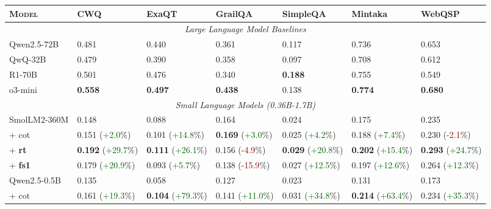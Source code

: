 \documentclass[11pt]{article}
\begin{document}
\begin{table}[t]
\centering
{}
\scriptsize
\begin{tabular}{lllllll}
\toprule
\textsc{Model} & \textbf{CWQ} & \textbf{ExaQT} & \textbf{GrailQA} & \textbf{SimpleQA} & \textbf{Mintaka} & \textbf{WebQSP} \\
\midrule
\multicolumn{7}{c}{\emph{Large Language Model Baselines}} \\
\midrule
Qwen2.5-72B & 0.481 & 0.440 & 0.361 & 0.117 & 0.736 & 0.653 \\
QwQ-32B & 0.479 & 0.390 & 0.358 & 0.097 & 0.708 & 0.612 \\
R1-70B & 0.501 & 0.476 & 0.340 & \textbf{0.188} & 0.755 & 0.549 \\
o3-mini & \textbf{0.558} & \textbf{0.497} & \textbf{0.438} & 0.138 & \textbf{0.774} & \textbf{0.680} \\
\midrule
\multicolumn{7}{c}{\emph{Small Language Models (0.36B-1.7B)}} \\
\midrule
SmolLM2-360M & 0.148 & 0.088 & 0.164 & 0.024 & 0.175 & 0.235 \\
\hspace{1em} + {cot} & 0.151 (\textcolor{darkgreen}{+2.0}\%) & 0.101 (\textcolor{darkgreen}{+14.8}\%) & \textbf{0.169} (\textcolor{darkgreen}{+3.0}\%) & 0.025 (\textcolor{darkgreen}{+4.2}\%) & 0.188 (\textcolor{darkgreen}{+7.4}\%) & 0.230 (\textcolor{darkred}{-2.1}\%) \\
\hspace{1em} + {\textbf{rt}} & \textbf{0.192} (\textcolor{darkgreen}{+29.7}\%) & \textbf{0.111} (\textcolor{darkgreen}{+26.1}\%) & 0.156 (\textcolor{darkred}{-4.9}\%) & \textbf{0.029} (\textcolor{darkgreen}{+20.8}\%) & \textbf{0.202} (\textcolor{darkgreen}{+15.4}\%) & \textbf{0.293} (\textcolor{darkgreen}{+24.7}\%) \\
\hspace{1em} + {\textbf{fs1}} & 0.179 (\textcolor{darkgreen}{+20.9}\%) & 0.093 (\textcolor{darkgreen}{+5.7}\%) & 0.138 (\textcolor{darkred}{-15.9}\%) & 0.027 (\textcolor{darkgreen}{+12.5}\%) & 0.197 (\textcolor{darkgreen}{+12.6}\%) & 0.264 (\textcolor{darkgreen}{+12.3}\%) \\
\midrule
Qwen2.5-0.5B & 0.135 & 0.058 & 0.127 & 0.023 & 0.131 & 0.173 \\
\hspace{1em} + {cot} & 0.161 (\textcolor{darkgreen}{+19.3}\%) & \textbf{0.104} (\textcolor{darkgreen}{+79.3}\%) & 0.141 (\textcolor{darkgreen}{+11.0}\%) & 0.031 (\textcolor{darkgreen}{+34.8}\%) & \textbf{0.214} (\textcolor{darkgreen}{+63.4}\%) & 0.234 (\textcolor{darkgreen}{+35.3}\%) \\

\end{tabular}
\end{table}
\end{document}
